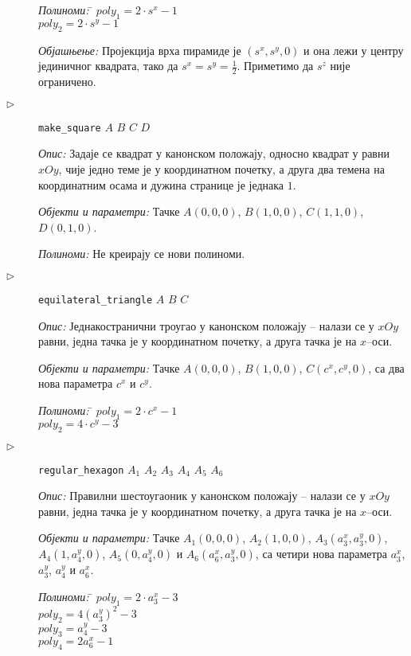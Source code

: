 \begin{description}
  \begin{tabbing}
    {\em Полиноми:} \= $poly_1 = 2\cdot s^x - 1$ \\
                   \> $poly_2 = 2\cdot s^y - 1$
  \end{tabbing}

  {\em Објашњење:} Пројекција врха пирамиде је $(s^x, s^y, 0)$ и она
  лежи у центру јединичног квадрата, тако да $s^x = s^y =
  \frac{1}{2}$. Приметимо да $s^z$ није ограничено.

\item[$\triangleright$] {\tt make\_square} $A$ $B$ $C$ $D$

  {\em Опис:} Задаје се квадрат у канонском положају, односно квадрат
  у равни $xOy$, чије једно теме је у координатном почетку, а друга
  два темена на координатним осама и дужина странице је једнака $1$.

  {\em Објекти и параметри:} Тачке $A(0, 0, 0)$, $B(1, 0, 0)$,
  $C(1, 1, 0)$, $D(0, 1, 0)$.


  {\em Полиноми:} Не креирају се нови полиноми.

\item[$\triangleright$] {\tt equilateral\_triangle} $A$ $B$ $C$

  {\em Опис:} Једнакостранични троугао у канонском положају -- налази
  се у $xOy$ равни, једна тачка је у координатном почетку, а друга
  тачка је на $x$--оси.

  {\em Објекти и параметри:} Тачке $A(0, 0, 0)$, $B(1, 0, 0)$,
  $C(c^x, c^y, 0)$, са два нова параметра $c^x$ и $c^y$.

\begin{tabbing}
{\em Полиноми:} \= $poly_1 = 2\cdot c^x - 1$ \\
                   \> $poly_2 = 4\cdot c^y - 3$
\end{tabbing}


\item[$\triangleright$] {\tt regular\_hexagon} $A_1$ $A_2$ $A_3$ $A_4$ $A_5$ $A_6$

  {\em Опис:} Правилни шестоугаоник у канонском положају -- налази се
  у $xOy$ равни, једна тачка је у координатном почетку, а друга тачка
  је на $x$--оси.

  {\em Објекти и параметри:} Тачке $A_1(0, 0, 0)$, $A_2(1, 0, 0)$,
  $A_3(a_3^x, a_3^y, 0)$, $A_4(1, a_4^y, 0)$, $A_5(0, a_4^y, 0)$ и
  $A_6(a_6^x, a_3^y, 0)$, са четири нова параметра $a_3^x$, $a_3^y$,
  $a_4^y$ и $a_6^x$.

\begin{tabbing}
{\em Полиноми:} \= $poly_1 = 2\cdot a_3^x - 3$ \\
                   \> $poly_2 = 4(a_3^y)^2 - 3$ \\
                   \> $poly_3 = a_4^y - 3$ \\
                   \> $poly_4 = 2a_6^x - 1$
\end{tabbing}
\end{description}

